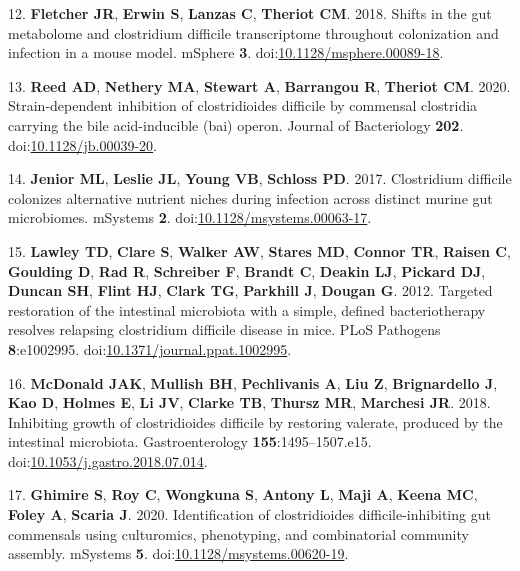 \documentclass[11pt,]{article}
\newlength{\cslhangindent}
\newenvironment{cslreferences}%
  {\setlength{\parindent}{0pt}%
  \everypar{\setlength{\hangindent}{\cslhangindent}}\ignorespaces}%
  {\par}
\begin{document}
\begin{cslreferences}
\leavevmode\hypertarget{ref-fletcher2018}{}%
12. \textbf{Fletcher JR}, \textbf{Erwin S}, \textbf{Lanzas C},
\textbf{Theriot CM}. 2018. Shifts in the gut metabolome and clostridium
difficile transcriptome throughout colonization and infection in a mouse
model. mSphere \textbf{3}.
doi:\href{https://doi.org/10.1128/msphere.00089-18}{10.1128/msphere.00089-18}.

\leavevmode\hypertarget{ref-reed2020}{}%
13. \textbf{Reed AD}, \textbf{Nethery MA}, \textbf{Stewart A},
\textbf{Barrangou R}, \textbf{Theriot CM}. 2020. Strain-dependent
inhibition of clostridioides difficile by commensal clostridia carrying
the bile acid-inducible (bai) operon. Journal of Bacteriology
\textbf{202}.
doi:\href{https://doi.org/10.1128/jb.00039-20}{10.1128/jb.00039-20}.

\leavevmode\hypertarget{ref-jenior2017}{}%
14. \textbf{Jenior ML}, \textbf{Leslie JL}, \textbf{Young VB},
\textbf{Schloss PD}. 2017. Clostridium difficile colonizes alternative
nutrient niches during infection across distinct murine gut microbiomes.
mSystems \textbf{2}.
doi:\href{https://doi.org/10.1128/msystems.00063-17}{10.1128/msystems.00063-17}.

\leavevmode\hypertarget{ref-lawley2012}{}%
15. \textbf{Lawley TD}, \textbf{Clare S}, \textbf{Walker AW},
\textbf{Stares MD}, \textbf{Connor TR}, \textbf{Raisen C},
\textbf{Goulding D}, \textbf{Rad R}, \textbf{Schreiber F},
\textbf{Brandt C}, \textbf{Deakin LJ}, \textbf{Pickard DJ},
\textbf{Duncan SH}, \textbf{Flint HJ}, \textbf{Clark TG},
\textbf{Parkhill J}, \textbf{Dougan G}. 2012. Targeted restoration of
the intestinal microbiota with a simple, defined bacteriotherapy
resolves relapsing clostridium difficile disease in mice. PLoS Pathogens
\textbf{8}:e1002995.
doi:\href{https://doi.org/10.1371/journal.ppat.1002995}{10.1371/journal.ppat.1002995}.

\leavevmode\hypertarget{ref-mcdonald2018}{}%
16. \textbf{McDonald JAK}, \textbf{Mullish BH}, \textbf{Pechlivanis A},
\textbf{Liu Z}, \textbf{Brignardello J}, \textbf{Kao D}, \textbf{Holmes
E}, \textbf{Li JV}, \textbf{Clarke TB}, \textbf{Thursz MR},
\textbf{Marchesi JR}. 2018. Inhibiting growth of clostridioides
difficile by restoring valerate, produced by the intestinal microbiota.
Gastroenterology \textbf{155}:1495--1507.e15.
doi:\href{https://doi.org/10.1053/j.gastro.2018.07.014}{10.1053/j.gastro.2018.07.014}.

\leavevmode\hypertarget{ref-ghimire2019}{}%
17. \textbf{Ghimire S}, \textbf{Roy C}, \textbf{Wongkuna S},
\textbf{Antony L}, \textbf{Maji A}, \textbf{Keena MC}, \textbf{Foley A},
\textbf{Scaria J}. 2020. Identification of clostridioides
difficile-inhibiting gut commensals using culturomics, phenotyping, and
combinatorial community assembly. mSystems \textbf{5}.
doi:\href{https://doi.org/10.1128/msystems.00620-19}{10.1128/msystems.00620-19}.


\end{cslreferences}
\end{document}
